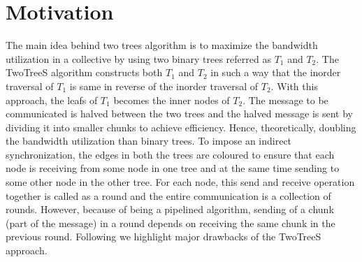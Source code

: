 \documentclass[sigplan,review,anonymous]{acmart}\settopmatter{printfolios=true,printccs=false,printacmref=false}
\begin{document}






\section{Motivation}\label{sec:Motivation}
The main idea behind two trees algorithm is to maximize the bandwidth utilization in a collective by using two binary trees referred as $T_1$ and $T_2$. The TwoTreeS algorithm constructs both $T_1$ and $T_2$ in such a way that the inorder traversal of $T_1$ is same in reverse of the inorder traversal of $T_2$. With this approach, the leafs of $T_1$ becomes the inner nodes of $T_2$. The message to be communicated is halved between the two trees and the halved message is sent by dividing it into smaller chunks to achieve efficiency. Hence, theoretically, doubling the bandwidth utilization than binary trees. To impose an indirect synchronization, the edges in both the trees are coloured to ensure that each node is receiving from some node in one tree and at the same time sending to some other node in the other tree. For each node, this send and receive operation together is called as a round and the entire communication is a collection of rounds. However, because of being a pipelined algorithm, sending of a chunk (part of the message) in a round depends on receiving the same chunk in the previous round. Following we highlight major drawbacks of the TwoTreeS approach.
\end{document}

